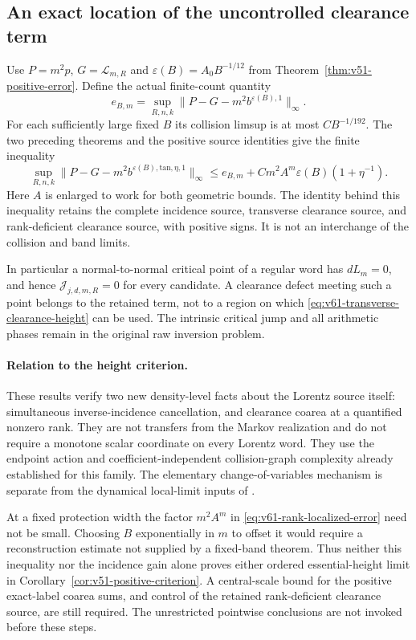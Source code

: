 \subsection{An exact location of the uncontrolled clearance term}
Use $P=m^2p$, $G=\mathcal L_{m,R}$ and
$\varepsilon(B)=A_0B^{-1/12}$ from
Theorem~\ref{thm:v51-positive-error}. Define the actual finite-count
quantity
\[
 e_{B,m}=\sup_{R,n,k}\|P-G-m^2b^{\varepsilon(B),1}\|_\infty.
\]
For each sufficiently large fixed $B$ its collision limsup is at most
$CB^{-1/192}$. The two preceding theorems and the positive source
identities give the finite inequality
\begin{equation}\label{eq:v61-rank-localized-error}
 \sup_{R,n,k}\|P-G-m^2b^{\varepsilon(B),\mathrm{tan},\eta,1}\|_\infty
 \le e_{B,m}+Cm^2A^m\varepsilon(B)(1+\eta^{-1}).
\end{equation}
Here $A$ is enlarged to work for both geometric bounds. The identity
behind this inequality retains the complete incidence source, transverse
clearance source, and rank-deficient clearance source, with positive
signs. It is not an interchange of the collision and band limits.

In particular a normal-to-normal critical point of a regular word has
$dL_m=0$, and hence $\mathcal J_{j,d,m,R}=0$ for every candidate.
A clearance defect meeting such a point belongs to the retained term,
not to a region on which \eqref{eq:v61-transverse-clearance-height}
can be used. The intrinsic critical jump and all arithmetic phases
remain in the original raw inversion problem.

\paragraph{Relation to the height criterion.}
These results verify two new density-level facts about the Lorentz
source itself: simultaneous inverse-incidence cancellation, and
clearance coarea at a quantified nonzero rank. They are not transfers
from the Markov realization and do not require a monotone scalar
coordinate on every Lorentz word. They use the endpoint action and
coefficient-independent collision-graph complexity already established
for this family. The elementary change-of-variables mechanism is
separate from the dynamical local-limit inputs of \cite{SV,DPZ,DN}.

At a fixed protection width the factor $m^2A^m$ in
\eqref{eq:v61-rank-localized-error} need not be small. Choosing $B$
exponentially in $m$ to offset it would require a reconstruction estimate
not supplied by a fixed-band theorem. Thus neither this inequality nor
the incidence gain alone proves either ordered essential-height limit
in Corollary~\ref{cor:v51-positive-criterion}. A central-scale bound
for the positive exact-label coarea sums, and control of the retained
rank-deficient clearance source, are still required. The unrestricted
pointwise conclusions are not invoked before these steps.
